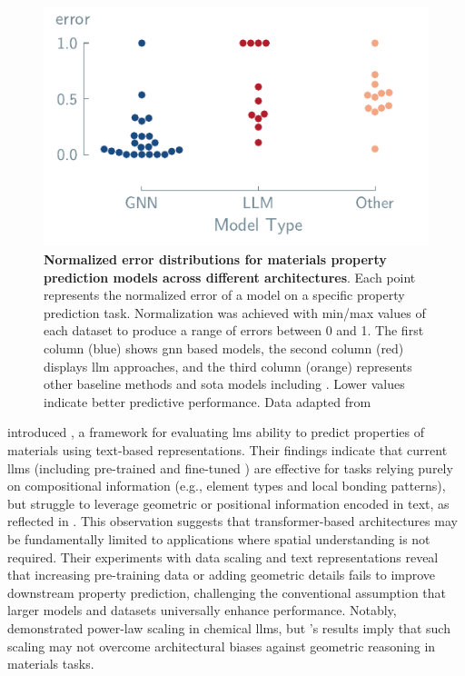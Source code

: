 \begin{figure}[htb]
    \centering
    \includegraphics{figures/property_mattext.pdf}
    \caption{\textbf{Normalized error distributions for materials property prediction models across different architectures}. Each point represents the normalized error of a model on a specific property prediction task. Normalization was achieved with min/max values of each dataset to produce a range of errors between 0 and 1. The first column (blue) shows \gls{gnn} based models, the second column (red) displays \gls{llm} approaches, and the third column (orange) represents other baseline methods and \gls{sota} models including . \autocite{Wang_2021} Lower values indicate better predictive performance. Data adapted from \textcite{alampara2024mattext}}
    \label{fig:property_limitations}
\end{figure}

\noindent \textcite{alampara2024mattext} introduced , a framework for evaluating \glspl{lm} ability to predict properties of materials using text-based representations. 
Their findings indicate that current \glspl{llm} (including pre-trained  and fine-tuned ) are effective for tasks relying purely on compositional information (e.g., element types and local bonding patterns), but struggle to leverage geometric or positional information encoded in text, as reflected in . 
This observation suggests that transformer-based architectures may be fundamentally limited to applications where spatial understanding is not required. 
Their experiments with data scaling and text representations reveal that increasing pre-training data or adding geometric details fails to improve downstream property prediction, challenging the conventional assumption that larger models and datasets universally enhance performance. \autocite{frey2023neural} 
Notably, \textcite{frey2023neural} demonstrated power-law scaling in chemical \glspl{llm}, but 's results imply that such scaling may not overcome architectural biases against geometric reasoning in materials tasks.\autocite{gruver2024promises}

